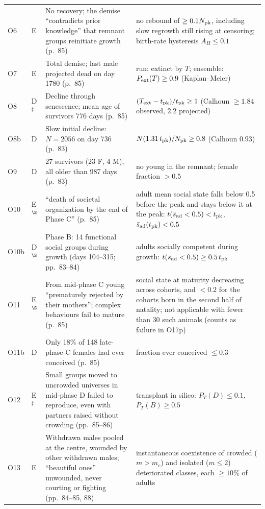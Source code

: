 {\begin{longtable}{@{}p{}p{}p{}p{}@{}}
O6 & E & No recovery; the demise ``contradicts prior knowledge'' that remnant groups reinitiate growth (p.~85) & no rebound of $\ge 0.1N_{\rm pk}$, including slow regrowth still rising at censoring; birth-rate hysteresis $A_H\le 0.1$ \\
O7 & E & Total demise; last male projected dead on day 1780 (p.~85) & run: extinct by $T$; ensemble: $P_{\rm ext}(T)\ge 0.9$ (Kaplan--Meier) \\
O8 & D$^\ddagger$ & Decline through senescence; mean age of survivors 776 days (p.~85) & $(T_{\rm ext}-t_{\rm pk})/t_{\rm pk}\ge 1$ (Calhoun $\ge 1.84$ observed, $2.2$ projected) \\
O8b & D & Slow initial decline: $N=2056$ on day 736 (p.~83) & $N(1.31\,t_{\rm pk})/N_{\rm pk}\ge 0.8$ (Calhoun $0.93$) \\
O9 & D & 27 survivors (23 F, 4 M), all older than 987 days (p.~83) & no young in the remnant; female fraction $>0.5$ \\
O10 & E$^\S$ & ``death of societal organization by the end of Phase C'' (p.~85) & adult mean social state falls below 0.5 before the peak and stays below it at the peak: $t(\bar s_{\rm ad}<0.5)<t_{\rm pk}$, $\bar s_{\rm ad}(t_{\rm pk})<0.5$ \\
O10b & D$^\S$ & Phase B: 14 functional social groups during growth (days 104--315; pp.~83--84) & adults socially competent during growth: $t(\bar s_{\rm ad}<0.5)\ge 0.5\,t_{\rm pk}$ \\
O11 & E$^\S$ & From mid-phase C young ``prematurely rejected by their mothers''; complex behaviours fail to mature (p.~85) & social state at maturity decreasing across cohorts, and $<0.2$ for the cohorts born in the second half of natality; not applicable with fewer than 30 such animals (counts as failure in O17p) \\
O11b & D & Only 18\% of 148 late-phase-C females had ever conceived (p.~85) & fraction ever conceived $\le 0.3$ \\
O12 & E$^\ddagger$ & Small groups moved to uncrowded universes in mid-phase D failed to reproduce, even with partners raised without crowding (pp.~85--86) & transplant in silico: $P_T(D)\le 0.1$, $P_T(B)\ge 0.5$ \\
O13 & E & Withdrawn males pooled at the centre, wounded by other withdrawn males; ``beautiful ones'' unwounded, never courting or fighting (pp.~84--85, 88) & instantaneous coexistence of crowded ($m>m_c$) and isolated ($m\le2$) deteriorated classes, each $\ge 10\%$ of adults \\

\end{longtable}}
